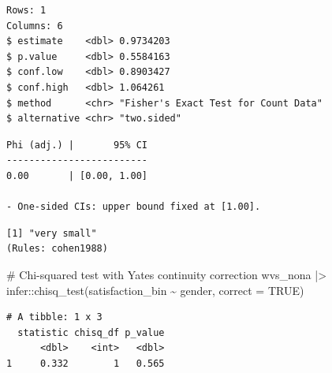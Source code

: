 \documentclass[
  letterpaper,
]{krantz}
\makeatletter
\newenvironment{Shaded}{\begin{snugshade}}{\end{snugshade}}
\newcommand{\AttributeTok}[1]{\textcolor[rgb]{0.40,0.45,0.13}{#1}}
\newcommand{\CommentTok}[1]{\textcolor[rgb]{0.37,0.37,0.37}{#1}}
\newcommand{\ConstantTok}[1]{\textcolor[rgb]{0.56,0.35,0.01}{#1}}
\newcommand{\DocumentationTok}[1]{\textcolor[rgb]{0.37,0.37,0.37}{\textit{#1}}}
\newcommand{\FunctionTok}[1]{\textcolor[rgb]{0.28,0.35,0.67}{#1}}
\newcommand{\NormalTok}[1]{\textcolor[rgb]{0.00,0.23,0.31}{#1}}
\newcommand{\OtherTok}[1]{\textcolor[rgb]{0.00,0.23,0.31}{#1}}
\newcommand{\SpecialCharTok}[1]{\textcolor[rgb]{0.37,0.37,0.37}{#1}}
\newcommand{\StringTok}[1]{\textcolor[rgb]{0.13,0.47,0.30}{#1}}
\newenvironment{kframe}{%
\medskip{}
\setlength{\fboxsep}{.8em}
 \def\at@end@of@kframe{}%
 \ifinner\ifhmode%
  \def\at@end@of@kframe{\end{minipage}}%
  \begin{minipage}{\columnwidth}%
 \fi\fi%
 \def\FrameCommand##1{\hskip\@totalleftmargin \hskip-\fboxsep
 \colorbox{shadecolor}{##1}\hskip-\fboxsep
     \hskip-\linewidth \hskip-\@totalleftmargin \hskip\columnwidth}%
 \MakeFramed {\advance\hsize-\width
   \@totalleftmargin\z@ \linewidth\hsize
   \@setminipage}}%
 {\par\unskip\endMakeFramed%
 \at@end@of@kframe}
\renewenvironment{Shaded}{\begin{kframe}}{\end{kframe}}
\makeatother
\begin{document}
\begin{verbatim}
Rows: 1
Columns: 6
$ estimate    <dbl> 0.9734203
$ p.value     <dbl> 0.5584163
$ conf.low    <dbl> 0.8903427
$ conf.high   <dbl> 1.064261
$ method      <chr> "Fisher's Exact Test for Count Data"
$ alternative <chr> "two.sided"
\end{verbatim}

\begin{Shaded}
\end{Shaded}

\begin{verbatim}
Phi (adj.) |       95% CI
-------------------------
0.00       | [0.00, 1.00]

- One-sided CIs: upper bound fixed at [1.00].
\end{verbatim}

\begin{Shaded}
\end{Shaded}

\begin{verbatim}
[1] "very small"
(Rules: cohen1988)
\end{verbatim}

\begin{Shaded}
\begin{Highlighting}[]
\CommentTok{\# Chi{-}squared test with Yate\textquotesingle{}s continuity correction}
\NormalTok{wvs\_nona }\SpecialCharTok{|\textgreater{}}\NormalTok{ infer}\SpecialCharTok{::}\FunctionTok{chisq\_test}\NormalTok{(satisfaction\_bin }\SpecialCharTok{\textasciitilde{}}\NormalTok{ gender,}
                               \AttributeTok{correct =} \ConstantTok{TRUE}\NormalTok{)}
\end{Highlighting}
\end{Shaded}

\begin{verbatim}
# A tibble: 1 x 3
  statistic chisq_df p_value
      <dbl>    <int>   <dbl>
1     0.332        1   0.565
\end{verbatim}
\end{document}
